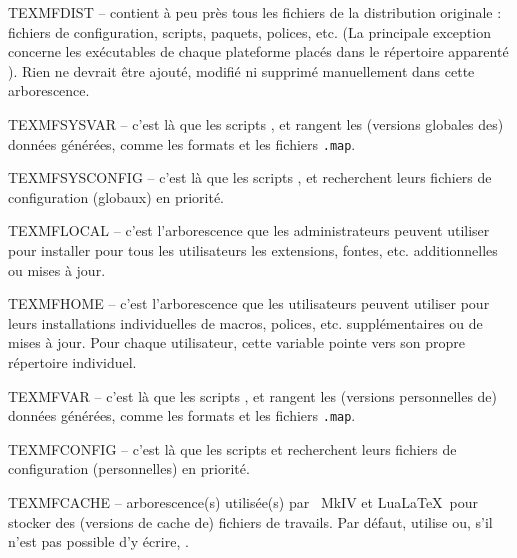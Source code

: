 \documentclass[german, english, french]{article}
\begin{document}
\begin{ttdescription}
\item[TEXMFDIST] -- contient à peu près tous les fichiers de la distribution
  originale : fichiers de configuration, scripts, paquets, polices, etc. (La
  principale exception concerne les exécutables de chaque plateforme placés
  dans le répertoire apparenté ).  Rien ne devrait être ajouté,
  modifié ni supprimé manuellement dans cette arborescence.
\item[TEXMFSYSVAR] -- c'est là que les scripts ,
   et  rangent les (versions globales
  des) données générées, comme les formats et les fichiers \verb+.map+.
\item[TEXMFSYSCONFIG] -- c'est là que les scripts ,
   et  recherchent leurs fichiers de
  configuration (globaux) en priorité.
\item[TEXMFLOCAL] -- c'est l'arborescence que les administrateurs peuvent
  utiliser pour installer pour tous les utilisateurs les extensions, fontes,
  etc. additionnelles ou mises à jour.
\item[TEXMFHOME] -- c'est l'arborescence que les utilisateurs peuvent utiliser
  pour leurs installations individuelles de macros, polices,
  etc. supplémentaires ou de mises à jour.  Pour chaque utilisateur, cette
  variable pointe vers son propre répertoire individuel.
\item[TEXMFVAR] -- c'est là que les scripts ,
   et  rangent les (versions
  personnelles de) données générées, comme les formats et les fichiers
  \verb+.map+.
\item[TEXMFCONFIG] -- c'est là que les scripts 
   et  recherchent leurs fichiers de
  configuration (personnelles) en priorité.
\item[TEXMFCACHE] -- arborescence(s) utilisée(s) par \ConTeXt\ MkIV et LuaLaTeX\
  pour stocker des (versions de cache de) fichiers de travails. Par défaut,
  utilise \code{TEXMFSYSVAR} ou, s'il n'est pas possible d'y écrire,
  \code{TEXMFVAR}.
\end{ttdescription}
\end{document}
